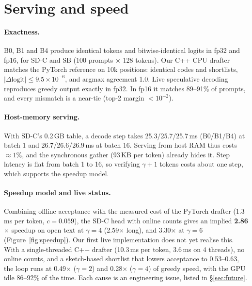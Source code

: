 \documentclass[11pt]{article}
\newcommand{\SB}{\textsc{SB}}
\newcommand{\SDC}{\textsc{SD-C}}
\begin{document}
\section{Serving and speed}
\label{sec:serving}

\paragraph{Exactness.}
B0, B1 and B4 produce identical tokens and bitwise-identical logits in fp32 and fp16, for \SDC{} and \SB{} (100 prompts
$\times$ 128 tokens). Our C++ CPU drafter matches the PyTorch reference on 10k positions: identical codes and shortlists,
$|\Delta\text{logit}|\le9.5\times10^{-6}$, and argmax agreement 1.0. Live speculative decoding reproduces greedy output
exactly in fp32. In fp16 it matches 89--91\% of prompts, and every mismatch is a near-tie (top-2 margin $<10^{-2}$).

\paragraph{Host-memory serving.}
With \SDC's 0.2\,GB table, a decode step takes 25.3/25.7/25.7\,ms (B0/B1/B4) at batch 1 and 26.7/26.6/26.9\,ms at batch 16.
Serving from host RAM thus costs ${\approx}1\%$, and the synchronous gather (93\,KB per token) already hides it. Step latency
is flat from batch 1 to 16, so verifying $\gamma{+}1$ tokens costs about one step, which supports the speedup model.

\paragraph{Speedup model and live status.}
Combining offline acceptance with the measured cost of the PyTorch drafter (1.3\,ms per token, $c=0.059$), the \SDC{}
head with online counts gives an implied \textbf{2.86$\times$} speedup on open text at $\gamma{=}4$ (2.59$\times$ long),
and 3.30$\times$ at $\gamma{=}6$ (Figure~\ref{fig:speedup}). Our first live implementation does not yet realise this. With
a single-threaded C++ drafter (10.3\,ms per token, 3.6\,ms on 4 threads), no online counts, and a sketch-based shortlist
that lowers acceptance to 0.53--0.63, the loop runs at 0.49$\times$ ($\gamma{=}2$) and 0.28$\times$ ($\gamma{=}4$) of
greedy speed, with the GPU idle 86--92\% of the time. Each cause is an engineering issue, listed in \S\ref{sec:future}.
\end{document}
